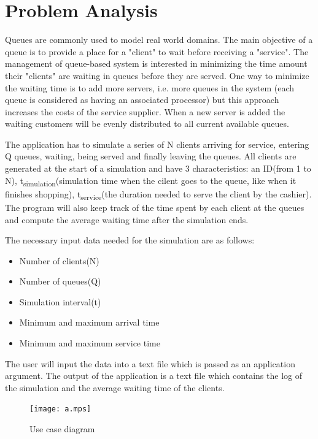 \documentclass[10pt,a4paper]{article}
\begin{document}
\section{Problem Analysis}
Queues are commonly used to model real world domains. The main objective of a queue is to
provide a place for a "client" to wait before receiving a "service". The management of queue-based
system is interested in minimizing the time amount their "clients" are waiting in queues before
they are served. One way to minimize the waiting time is to add more servers, i.e. more queues in
the system (each queue is considered as having an associated processor) but this approach increases
the costs of the service supplier. When a new server is added the waiting customers will be evenly
distributed to all current available queues. \par
The application has to simulate a series of N clients arriving for service, entering Q queues, waiting, being served and finally leaving the queues. All clients are generated at the start of a simulation and have 3 characteristics: an ID(from 1 to N), t\textsubscript{simulation}(simulation time when the cilent goes to the queue, like when it finishes shopping), t\textsubscript{service}(the duration needed to serve the client by the cashier). The program will also keep track of the time spent by each client at the queues and compute the average waiting time after the simulation ends.\par
The necessary input data needed for the simulation are as follows:
\begin{itemize}
\item Number of clients(N)
\item Number of queues(Q)
\item Simulation interval(t\space\space\space\space\space\space\space\space\space\space\space)
\item Minimum and maximum arrival time
\item Minimum and maximum service time
\end{itemize}
\pagebreak
The user will input the data into a text file which is passed as an application argument. The output of the application is a text file which contains the log of the simulation and the average waiting time of the clients.
\begin{figure}[!htb]

\centering
\texttt{[image: a.mps]}
\caption{Use case diagram}
\end{figure}
\end{document}
